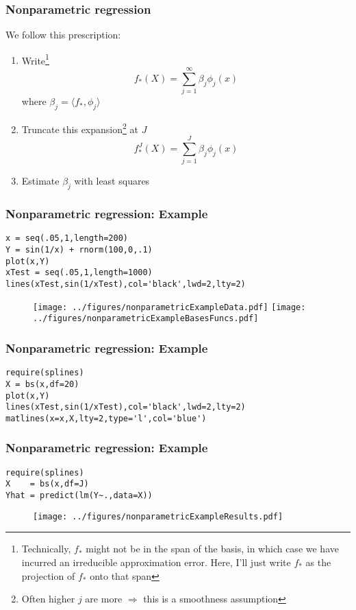 \documentclass[12pt]{beamer}
\begin{document}
\begin{frame}[fragile]
\frametitle{Nonparametric regression}


We follow this prescription:

\begin{enumerate}
\item Write\footnote{Technically, $f_*$ might not be in the span of the basis, in which case we have incurred
an irreducible approximation error.  Here, I'll just write $f_*$ as the projection of $f_*$ onto that span}
\[
f_*(X) =\sum_{j=1}^\infty \beta_j \phi_j(x)
\]
where $\beta_j = \langle f_*, \phi_j \rangle$
\item Truncate this expansion\footnote{Often higher $j$ are more  $\Rightarrow$ this is a smoothness assumption} at $J$
\[
f_*^J(X) =\sum_{j=1}^J \beta_j \phi_j(x)
\]
\item Estimate $\beta_j$ with least squares 
\end{enumerate}
\end{frame}

\begin{frame}[fragile]
\frametitle{Nonparametric regression: Example}
\begin{verbatim}
x = seq(.05,1,length=200)
Y = sin(1/x) + rnorm(100,0,.1)
plot(x,Y)
xTest = seq(.05,1,length=1000)
lines(xTest,sin(1/xTest),col='black',lwd=2,lty=2)
\end{verbatim}
\begin{figure}
\centering
\texttt{[image: ../figures/nonparametricExampleData.pdf]}
\texttt{[image: ../figures/nonparametricExampleBasesFuncs.pdf]}
\end{figure}
\end{frame}

\begin{frame}[fragile]
\frametitle{Nonparametric regression: Example}
\begin{verbatim}
require(splines)
X = bs(x,df=20)
plot(x,Y)
lines(xTest,sin(1/xTest),col='black',lwd=2,lty=2)
matlines(x=x,X,lty=2,type='l',col='blue')
\end{verbatim}
\end{frame}



\begin{frame}[fragile]
\frametitle{Nonparametric regression: Example}
\begin{verbatim}
require(splines)
X    = bs(x,df=J)
Yhat = predict(lm(Y~.,data=X))
\end{verbatim}
\begin{figure}
\centering
\texttt{[image: ../figures/nonparametricExampleResults.pdf]}
\end{figure}
\end{frame}
\end{document}
